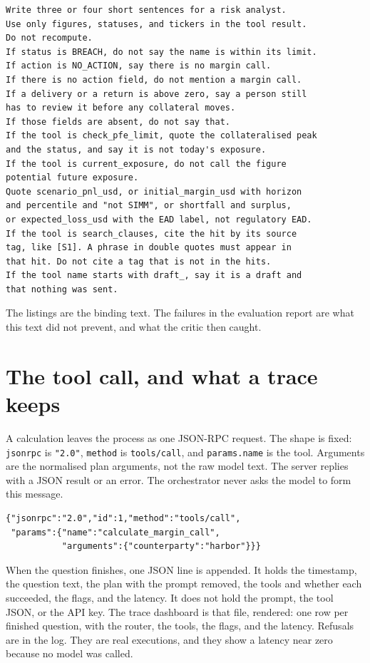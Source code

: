 \documentclass[11pt,a4paper]{article}
\begin{document}
\begin{lstlisting}
Write three or four short sentences for a risk analyst.
Use only figures, statuses, and tickers in the tool result.
Do not recompute.
If status is BREACH, do not say the name is within its limit.
If action is NO_ACTION, say there is no margin call.
If there is no action field, do not mention a margin call.
If a delivery or a return is above zero, say a person still
has to review it before any collateral moves.
If those fields are absent, do not say that.
If the tool is check_pfe_limit, quote the collateralised peak
and the status, and say it is not today's exposure.
If the tool is current_exposure, do not call the figure
potential future exposure.
Quote scenario_pnl_usd, or initial_margin_usd with horizon
and percentile and "not SIMM", or shortfall and surplus,
or expected_loss_usd with the EAD label, not regulatory EAD.
If the tool is search_clauses, cite the hit by its source
tag, like [S1]. A phrase in double quotes must appear in
that hit. Do not cite a tag that is not in the hits.
If the tool name starts with draft_, say it is a draft and
that nothing was sent.
\end{lstlisting}

The listings are the binding text. The failures in the evaluation report are what this text did not prevent, and what the critic then caught.

\section{The tool call, and what a trace keeps}

A calculation leaves the process as one JSON-RPC request. The shape is fixed: \texttt{jsonrpc} is \texttt{"2.0"}, \texttt{method} is \texttt{tools/call}, and \texttt{params.name} is the tool. Arguments are the normalised plan arguments, not the raw model text. The server replies with a JSON result or an error. The orchestrator never asks the model to form this message.

\begin{lstlisting}
{"jsonrpc":"2.0","id":1,"method":"tools/call",
 "params":{"name":"calculate_margin_call",
           "arguments":{"counterparty":"harbor"}}}
\end{lstlisting}

When the question finishes, one JSON line is appended. It holds the timestamp, the question text, the plan with the prompt removed, the tools and whether each succeeded, the flags, and the latency. It does not hold the prompt, the tool JSON, or the API key. The trace dashboard is that file, rendered: one row per finished question, with the router, the tools, the flags, and the latency. Refusals are in the log. They are real executions, and they show a latency near zero because no model was called.
\end{document}
